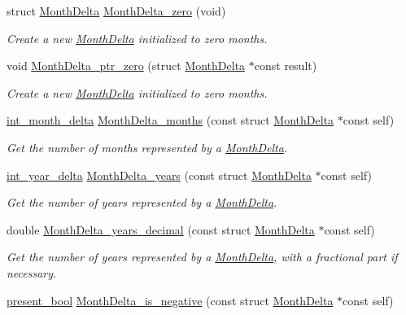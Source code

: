 \begin{DoxyCompactItemize}
struct \hyperlink{structMonthDelta}{Month\-Delta} \hyperlink{month-delta_8h_ae02c3e6efa8f92b3ac624aa6513abd65}{Month\-Delta\-\_\-zero} (void)
\begin{DoxyCompactList}\small\item\em Create a new \hyperlink{structMonthDelta}{Month\-Delta} initialized to zero months. \end{DoxyCompactList}\item 
void \hyperlink{month-delta_8h_aecc1d070d7db1982cd5f98224f738d35}{Month\-Delta\-\_\-ptr\-\_\-zero} (struct \hyperlink{structMonthDelta}{Month\-Delta} $\ast$const result)
\begin{DoxyCompactList}\small\item\em Create a new \hyperlink{structMonthDelta}{Month\-Delta} initialized to zero months. \end{DoxyCompactList}\item 
\hyperlink{types_8h_adc711c00c117528b40875ad0119c687f}{int\-\_\-month\-\_\-delta} \hyperlink{month-delta_8h_aa35507c658c9d6f3a038b44d1cdb6452}{Month\-Delta\-\_\-months} (const struct \hyperlink{structMonthDelta}{Month\-Delta} $\ast$const self)
\begin{DoxyCompactList}\small\item\em Get the number of months represented by a \hyperlink{structMonthDelta}{Month\-Delta}. \end{DoxyCompactList}\item 
\hyperlink{types_8h_ad2a6eecbd190f1ae0327acdeaf596623}{int\-\_\-year\-\_\-delta} \hyperlink{month-delta_8h_aaccb951f5a7295ce0cc3d9b6b77f2d21}{Month\-Delta\-\_\-years} (const struct \hyperlink{structMonthDelta}{Month\-Delta} $\ast$const self)
\begin{DoxyCompactList}\small\item\em Get the number of years represented by a \hyperlink{structMonthDelta}{Month\-Delta}. \end{DoxyCompactList}\item 
double \hyperlink{month-delta_8h_a9215cb412f007649e357ba8cd9e171b9}{Month\-Delta\-\_\-years\-\_\-decimal} (const struct \hyperlink{structMonthDelta}{Month\-Delta} $\ast$const self)
\begin{DoxyCompactList}\small\item\em Get the number of years represented by a \hyperlink{structMonthDelta}{Month\-Delta}, with a fractional part if necessary. \end{DoxyCompactList}\item 
\hyperlink{types_8h_a1c24e2cdd988b886e889080ded176ae0}{present\-\_\-bool} \hyperlink{month-delta_8h_ada77ded958313a9162d1a7337b0374c7}{Month\-Delta\-\_\-is\-\_\-negative} (const struct \hyperlink{structMonthDelta}{Month\-Delta} $\ast$const self)

\end{DoxyCompactItemize}
